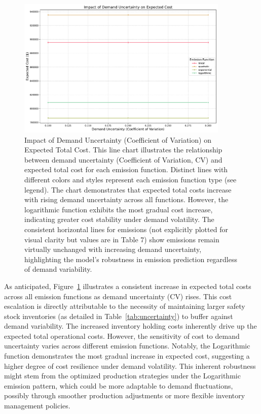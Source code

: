\begin{table}[htbp]
\begin{figure}[t!]
    \centering
    \includegraphics[width=0.9\textwidth]{images/demand_uncertainty_impact.pdf}
    \caption{Impact of Demand Uncertainty (Coefficient of Variation) on Expected Total Cost. This line chart illustrates the relationship between demand uncertainty (Coefficient of Variation, CV) and expected total cost for each emission function.  Distinct lines with different colors and styles represent each emission function type (see legend). The chart demonstrates that expected total costs increase with rising demand uncertainty across all functions.  However, the logarithmic function exhibits the most gradual cost increase, indicating greater cost stability under demand volatility. The consistent horizontal lines for emissions (not explicitly plotted for visual clarity but values are in Table 7) show emissions remain virtually unchanged with increasing demand uncertainty, highlighting the model's robustness in emission prediction regardless of demand variability.}
    \label{fig:demand_uncertainty_line}
\end{figure}


As anticipated, Figure~\ref{fig:demand_uncertainty_line} illustrates a consistent increase in expected total costs across all emission functions as demand uncertainty (CV) rises. This cost escalation is directly attributable to the necessity of maintaining larger safety stock inventories (as detailed in Table~\ref{tab:uncertainty}) to buffer against demand variability. The increased inventory holding costs inherently drive up the expected total operational costs. However, the sensitivity of cost to demand uncertainty varies across different emission functions.  Notably, the Logarithmic function demonstrates the most gradual increase in expected cost, suggesting a higher degree of cost resilience under demand volatility. This inherent robustness might stem from the optimized production strategies under the Logarithmic emission pattern, which could be more adaptable to demand fluctuations, possibly through smoother production adjustments or more flexible inventory management policies.


\end{table}
